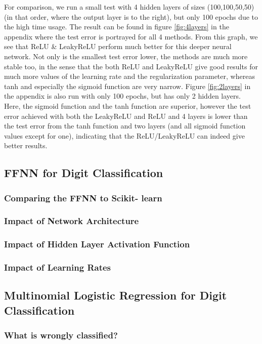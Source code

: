 \documentclass[11pt,a4paper,titlepage]{article}
\begin{document}
For comparison, we run a small test with 4 hidden layers of sizes (100,100,50,50) (in that order, where the output layer is to the right), but only 100 epochs due to the high time usage. The result can be found in figure \ref{fig:4layers} in the appendix where the test error is portrayed for all 4 methods. From this graph, we see that ReLU \& LeakyReLU perform much better for this deeper neural network. Not only is the smallest test error lower, the methods are much more stable too, in the sense that the both ReLU and LeakyReLU give good results for much more values of the learning rate and the regularization parameter, whereas tanh and especially the sigmoid function are very narrow. Figure \ref{fig:2layers} in the appendix is also run with only 100 epochs, but has only 2 hidden layers. Here, the sigmoid function and the tanh function are superior, however the test error achieved with both the LeakyReLU and ReLU and 4 layers is lower than the test error from the tanh function and two layers (and all sigmoid function values except for one), indicating that the ReLU/LeakyReLU can indeed give better results.


\subsection{FFNN for Digit Classification}
\subsubsection{Comparing the FFNN to Scikit- learn}
\subsubsection{Impact of Network Architecture}
\subsubsection{Impact of Hidden Layer Activation Function}
\subsubsection{Impact of Learning Rates}

\subsection{Multinomial Logistic Regression for Digit Classification}
\subsubsection{What is wrongly classified?}
\end{document}
